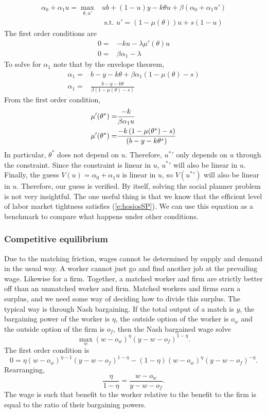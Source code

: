 \documentclass[12pt,reqno]{amsart}
\theoremstyle{definition}
\begin{document}
\begin{align*}
  \alpha_0 + \alpha_1 u = \max_{\theta,u'} & u b + (1-u) y - k \theta
  u + \beta \left(\alpha_0 + \alpha_1 u' \right) \\ 
  & \text{ s.t. } u' = (1-\mu(\theta)) u + s(1-u)
\end{align*}
The first order conditions are
\begin{align*}
  0 = & -ku - \lambda \mu'(\theta) u \\
  0 = & \beta \alpha_1 - \lambda
\end{align*}
To solve for $\alpha_1$ note that by the envelope theorem,
\begin{align*} \alpha_1 = & b - y - k\theta + \beta
  \alpha_1\left(1-\mu(\theta) - s \right) \\ 
  \alpha_1 = & \frac{b - y - k\theta}{\beta\left(1-\mu(\theta) - s
    \right)} 
\end{align*}
From the first order condition,
\begin{align}
  \mu'(\theta^*) = & \frac{-k}{\beta \alpha_1 u} \notag \\
  \mu'(\theta^*) = & \frac{-k\left(1-\mu(\theta^*) - s \right)}{ \left(b-y-k
      \theta^* \right)} \label{e:hosiosSP}
\end{align}
In particular, $\theta^*$ does not depend on $u$. Therefore, ${u^*}'$ only
depends on $u$ through the constraint. Since the constraint is linear
in $u$, ${u^*}'$ will also be linear in $u$. Finally, the guess $V(u) =
\alpha_0 + \alpha_1 u$ is linear in $u$, so $V({u^*}')$ will also be
linear in $u$. Therefore, our guess is verified. By itself, solving
the social planner problem is not very insightful. The one useful
thing is that we know that the efficient level of labor market
tightness satisfies (\ref{e:hosiosSP}). We can use this equation as a
benchmark to compare what happens under other conditions. 

\subsubsection{Competitive equilibrium} 

Due to the matching friction, wages cannot be determined by supply and
demand in the usual way. A worker cannot just go and find another job
at the prevailing wage. Likewise for a firm. Together, a matched
worker and firm are strictly better off than an unmatched worker and
firm. Matched workers and firms earn a surplus, and we need some way
of deciding how to divide this surplus. The typical way is through
Nash bargaining. If the total output of a match is $y$, the bargaining
power of the worker is $\eta$, the outside option of the worker is
$o_w$ and the outside option of the firm is $o_f$, then the Nash
bargained wage solve
\[ \max_w (w - o_w)^\eta (y-w - o_f)^{1-\eta}. \]
The first order condition is
\[ 0 = \eta (w - o_w)^{\eta-1} (y-w - o_f)^{1-\eta} - (1-\eta) (w -
o_w)^\eta (y-w - o_f)^{-\eta}. \]
Rearranging,
\[ \frac{\eta}{1-\eta} = \frac{ w - o_w} {y-w - o_f}. \]
The wage is such that benefit to the worker relative to the benefit to
the firm is equal to the ratio of their bargaining powers. 
\end{document}
